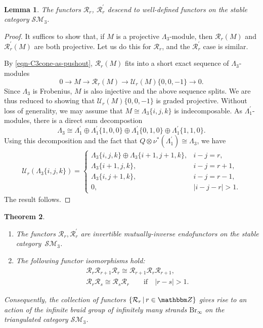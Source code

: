 \documentclass[10pt,a4paper]{amsart}
\newtheorem{thm}{Theorem}[section]
\newtheorem{lem}[thm]{Lemma}
\theoremstyle{definition}
\numberwithin{equation}{section}
\def\Z{{\mathbbm Z}}
\def\lra{{\longrightarrow}}
\def\mc{\mathcal}
\begin{document}
\begin{lem}The functors $\mc{R}_r$, $\mc{R}_r^\prime$ descend to well-defined functors on the stable category $\mc{SM}_3$.
\end{lem}
\begin{proof}It suffices to show that, if $M$ is a projective $\Lambda_3$-module, then $\mc{R}_r(M)$ and $\mc{R}^\prime_r(M)$ are both projective. Let us do this for $\mc{R}_r$, and the $\mc{R}^\prime_r$ case is similar.

By \eqref{eqn-C3cone-as-pushout}, $\mc{R}_r(M)$ fits into a short exact sequence of $\Lambda_3$-modules
\[
0\lra M \lra \mc{R}_r(M)\lra \mc{U}_r(M)\{0,0,-1\} \lra 0.
\]
Since $\Lambda_3$ is Frobenius, $M$ is also injective and the above sequence splits. We are thus reduced to showing that $\mc{U}_r(M)\{0,0,-1\}$ is graded projective. Without loss of generality, we may assume that $M\cong \Lambda_3\{i,j,k\}$ is indecomposable. As $\Lambda_1^\prime$-modules, there is a direct sum decompostion
\[
\Lambda_3\cong \Lambda_1^\prime\oplus \Lambda_1^\prime\{1,0,0\} \oplus \Lambda_1^\prime\{0,1,0\} \oplus \Lambda_1^\prime\{1,1,0\}.
\]
Using this decomposition and the fact that $Q\otimes \nu^*(\Lambda_1^\prime) \cong \Lambda_3$, we have
\begin{gather*}
\mc{U}_r(\Lambda_3\{i,j,k\})
=\begin{cases}
\Lambda_3\{i,j,k\} \oplus \Lambda_3\{i+1,j+1,k\}, & i-j=r,\\
\Lambda_3\{i+1,j,k\}, & i-j=r+1,\\
\Lambda_3\{i,j+1,k\}, & i-j=r-1,\\
0, & |i-j-r|>1.
\end{cases}
\end{gather*}
The result follows.
\end{proof}


\begin{thm} \label{thm-3-braid-group-actions}\quad
\begin{enumerate}\itemsep=0pt
\item [$(i)$]The functors $\mc{R}_r,\mc{R}^\prime_r$ are invertible mutually-inverse endofunctors on the stable catego\-ry~$\mc{SM}_3$.
\item[$(ii)$]The following functor isomorphisms hold:
\begin{subequations}
\begin{gather}
\label{rel-yb}
\mc{R}_r \mc{R}_{r+1} \mc{R}_r \cong \mc{R}_{r+1} \mc{R}_r \mc{R}_{r+1},\\
\label{rel-comm}
\mc{R}_r \mc{R}_s \cong \mc{R}_s \mc{R}_r\qquad \mathrm{if}\quad |r-s|>1.
\end{gather}
\end{subequations}
\end{enumerate}
Consequently, the collection of functors $\{\mc{R}_r\,|\,r\in \Z\}$ gives rise to an action of the infinite braid group of infinitely many strands $\mathrm{Br}_\infty$ on the triangulated category $\mc{SM}_3$.
\end{thm}
\end{document}
